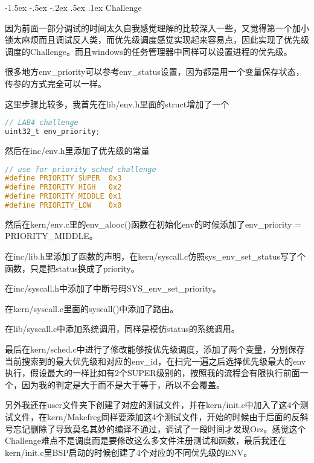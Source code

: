 \documentclass[11pt,a4paper]{article}
\makeatletter
\newcommand{\sanhao}{\fontsize{15.75pt}{\baselineskip}\selectfont}
\renewcommand\section{\@startsection{section}{1}{\z@}%
{-1.5ex \@plus -.5ex \@minus -.2ex}%
{.5ex \@plus .1ex}%
{\normalfont\sanhao\fontspec{黑体}}}
\makeatother
\begin{document}
\section{Challenge}

因为前面一部分调试的时间太久自我感觉理解的比较深入一些，又觉得第一个加小锁太麻烦而且调试反人类，而优先级调度感觉实现起来容易点，因此实现了优先级调度的Challenge。而且windows的任务管理器中同样可以设置进程的优先级。

很多地方env\_priority可以参考env\_status设置，因为都是用一个变量保存状态，传参的方式完全可以一样。

这里步骤比较多，我首先在lib/env.h里面的struct增加了一个
\setmainfont{Consolas}
\begin{lstlisting}[language={C},firstnumber=1,title=lib/env.h]
// LAB4 challenge
uint32_t env_priority;
\end{lstlisting}
\setmainfont[BoldFont=黑体]{宋体}

然后在inc/env.h里添加了优先级的常量

\setmainfont{Consolas}
\begin{lstlisting}[language={C},firstnumber=1,title=lib/env.h]
// use for priority sched challenge
#define PRIORITY_SUPER	0x3
#define PRIORITY_HIGH	0x2
#define PRIORITY_MIDDLE	0x1
#define PRIORITY_LOW	0x0
\end{lstlisting}
\setmainfont[BoldFont=黑体]{宋体}

然后在kern/env.c里的env\_alooc()函数在初始化env的时候添加了env\_priority = PRIORITY\_MIDDLE。

在inc/lib.h里添加了函数的声明，在kern/syscall.c仿照sys\_env\_set\_status写了个函数，只是把status换成了priority。

在inc/syscall.h中添加了中断号码SYS\_env\_set\_priority。

在kern/syscall.c里面的syscall()中添加了路由。

在lib/syscall.c中添加系统调用，同样是模仿status的系统调用。

最后在kern/sched.c中进行了修改能够按优先级调度，添加了两个变量，分别保存当前搜索到的最大优先级和对应的env\_id，在扫完一遍之后选择优先级最大的env执行，假设最大的一样比如有2个SUPER级别的，按照我的流程会有限执行前面一个，因为我的判定是大于而不是大于等于，所以不会覆盖。

另外我还在user文件夹下创建了对应的测试文件，并在kern/init.c中加入了这4个测试文件，在kern/Makefreg同样要添加这4个测试文件，开始的时候由于后面的反斜号忘记删除了导致莫名其妙的编译不通过，调试了一段时间才发现Orz。感觉这个Challenge难点不是调度而是要修改这么多文件注册测试和函数，最后我还在kern/init.c里BSP启动的时候创建了4个对应的不同优先级的ENV。
\end{document}
